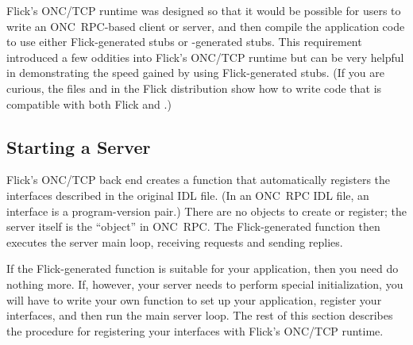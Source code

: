 

Flick's ONC/TCP runtime was designed so that it would be possible for users to
write an ONC~RPC-based client or server, and then compile the application code
to use either Flick-generated stubs or -generated stubs.  This
requirement introduced a few oddities into Flick's ONC/TCP runtime but can be
very helpful in demonstrating the speed gained by using Flick-generated stubs.
(If you are curious, the files  and
 in the Flick distribution show how
to write code that is compatible with both Flick and .)



\subsection{Starting a Server}
\label{subsec:Starting a Server}

Flick's ONC/TCP back end creates a  function that automatically
registers the interfaces described in the original IDL file.  (In an ONC~RPC
IDL file, an interface is a program-version pair.)  There are no objects to
create or register; the server itself is the ``object'' in ONC~RPC\@.  The
Flick-generated  function then executes the server main loop,
receiving requests and sending replies.

If the Flick-generated  function is suitable for your
application, then you need do nothing more.  If, however, your server needs to
perform special initialization, you will have to write your own
 function to set up your application, register your interfaces,
and then run the main server loop.  The rest of this section describes the
procedure for registering your interfaces with Flick's ONC/TCP runtime.


